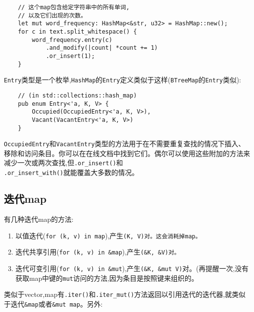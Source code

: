 \begin{verbatim}
    // 这个map包含给定字符串中的所有单词,
    // 以及它们出现的次数。
    let mut word_frequency: HashMap<&str, u32> = HashMap::new();
    for c in text.split_whitespace() {
        word_frequency.entry(c)
            .and_modify(|count| *count += 1)
            .or_insert(1);
    }
\end{verbatim}

\texttt{Entry}类型是一个枚举,\texttt{HashMap}的\texttt{Entry}定义类似于这样(\texttt{BTreeMap}的\texttt{Entry}类似):
\begin{verbatim}
    // (in std::collections::hash_map)
    pub enum Entry<'a, K, V> {
        Occupied(OccupiedEntry<'a, K, V>),
        Vacant(VacantEntry<'a, K, V>)
    }
\end{verbatim}

\texttt{OccupiedEntry}和\texttt{VacantEntry}类型的方法用于在不需要重复查找的情况下插入、移除和访问条目。你可以在在线文档中找到它们。偶尔可以使用这些附加的方法来减少一次或两次查找,但\texttt{.or\_insert()}和\\
\texttt{.or\_insert\_with()}就能覆盖大多数的情况。

\subsection{迭代map}
有几种迭代map的方法:
\begin{enumerate}
    \item 以值迭代(\texttt{for (k, v) in map}),产生\texttt{(K, V)对。这会消耗掉map。}
    \item 迭代共享引用(\texttt{for (k, v) in \&map}),产生\texttt{(\&K, \&V)对。}
    \item 迭代可变引用(\texttt{for (k, v) in \&mut}),产生\texttt{(\&K, \&mut V)}对。(再提醒一次,没有获取map中键的\texttt{mut}访问的方法,因为条目是按照键来组织的。
\end{enumerate}

类似于vector,map有\texttt{.iter()}和\texttt{.iter\_mut()}方法返回以引用迭代的迭代器,就类似于迭代\texttt{\&map}或者\texttt{\&mut map}。另外:





